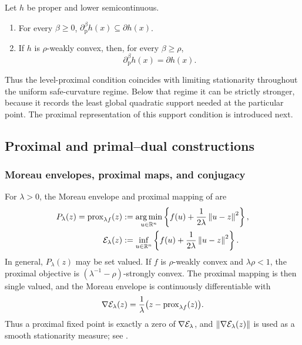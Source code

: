 \begin{lemma}
  \label{lem:level-prox-properties}
  Let \(h\) be proper and lower semicontinuous.
  \begin{enumerate}[label=(\roman*)]
    \item For every \(\beta\ge0\),
      \(\partial_{\mathrm p}^{\beta}h(x)\subseteq\partial h(x)\).
    \item If \(h\) is \(\rho\)-weakly convex, then, for every
      \(\beta\ge\rho\),
      \begin{equation}
        \partial_{\mathrm p}^{\beta}h(x)=\partial h(x).
        \label{eq:level-prox-weak-convex}
      \end{equation}
  \end{enumerate}
\end{lemma}

Thus the level-proximal condition coincides with limiting stationarity
throughout the uniform safe-curvature regime.  Below that regime it can be
strictly stronger, because it records the least global quadratic support
needed at the particular point.  The proximal representation of this support
condition is introduced next.

\subsection{Proximal and primal--dual constructions}

\subsubsection{Moreau envelopes, proximal maps, and conjugacy}

For \(\lambda>0\), the Moreau envelope and proximal mapping of
\citet[Definition~1.22]{RockafellarWets1998} are
\begin{align}
  P_\lambda(z)=\operatorname{prox}_{\lambda f}(z)
    &:=\operatorname*{arg\,min}_{u\in\mathbb{R}^n}
       \left\{f(u)+\frac{1}{2\lambda}\left\lVert u-z\right\rVert^2\right\}, \label{eq:prox}\\
  \mathcal{E}_\lambda(z)
    &:=\inf_{u\in\mathbb{R}^n}
       \left\{f(u)+\frac{1}{2\lambda}\left\lVert u-z\right\rVert^2\right\}. \label{eq:moreau}
\end{align}
In general, \(P_\lambda(z)\) may be set valued.  If \(f\) is
\(\rho\)-weakly convex and \(\lambda\rho<1\), the proximal objective is
\((\lambda^{-1}-\rho)\)-strongly convex.  The proximal mapping is then
single valued, and the Moreau envelope is continuously differentiable with
\begin{equation}
  \nabla\mathcal{E}_\lambda(z)
    =\frac{1}{\lambda}
      \bigl(z-\operatorname{prox}_{\lambda f}(z)\bigr).
  \label{eq:moreau-gradient}
\end{equation}
Thus a proximal fixed point is exactly a zero of
\(\nabla\mathcal{E}_\lambda\), and
\(\left\lVert \nabla\mathcal{E}_\lambda(z)\right\rVert\) is used as a smooth stationarity
measure; see \citet[Lemma~2.2]{DavisDrusvyatskiy2019}.

